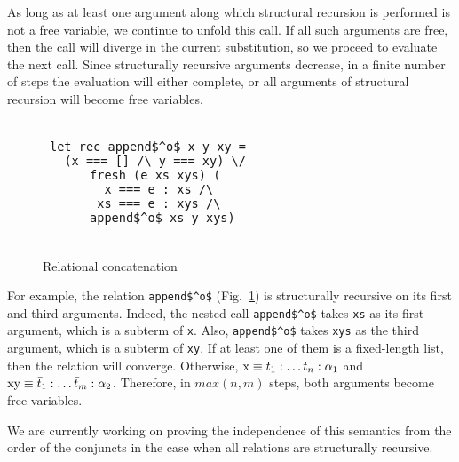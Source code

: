 
As long as at least one argument along which structural recursion is performed is not a free variable, we continue to unfold this call. If all such arguments are free, then the call
will diverge in the current substitution, so we proceed to evaluate the next call. Since structurally recursive arguments decrease, in a finite number of steps the evaluation will
either complete, or all arguments of structural recursion will become free variables.


\begin{figure}[h!]
\centering
\begin{tabular}{c}
\begin{lstlisting}
let rec append$^o$ x y xy =
  (x === [] /\ y === xy) \/
  fresh (e xs xys) (
    x === e : xs /\ 
    xs === e : xys /\ 
    append$^o$ xs y xys)
\end{lstlisting}
\end{tabular}
\caption{Relational concatenation}
\label{fair:lst-appendo}
\end{figure}

For example, the relation \lstinline{append$^o$} (Fig.~\ref{fair:lst-appendo}) is structurally recursive on its first and third arguments. Indeed, the nested call \lstinline{append$^o$}
takes \lstinline{xs} as its first argument, which is a subterm of \lstinline{x}. Also, \lstinline{append$^o$} takes \lstinline{xys} as the third argument, which is a subterm of
\lstinline{xy}. If at least one of them is a fixed-length list, then the relation will converge. Otherwise, $\mbox{\lstinline{x}} \equiv t_1 : \ldots t_n : \alpha_1$
and $\mbox{\lstinline{xy}} \equiv \bar{t}_1 : \ldots \bar{t}_m : \alpha_2$. Therefore, in $max(n, m)$ steps, both arguments become free variables.

We are currently working on proving the independence of this semantics from the order of the conjuncts in the case when all relations are structurally recursive.
